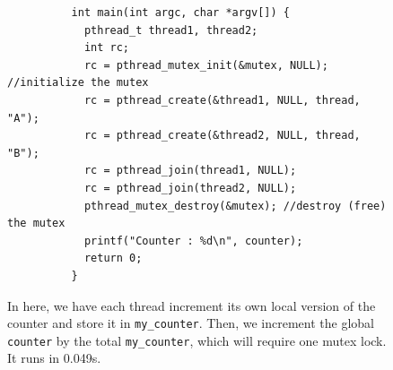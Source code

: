 \documentclass{article}
\begin{document}
\begin{enumerate}
\begin{figure}[H]
\begin{lstlisting}
          int main(int argc, char *argv[]) {
            pthread_t thread1, thread2; 
            int rc; 
            rc = pthread_mutex_init(&mutex, NULL); //initialize the mutex
            rc = pthread_create(&thread1, NULL, thread, "A"); 
            rc = pthread_create(&thread2, NULL, thread, "B"); 
            rc = pthread_join(thread1, NULL); 
            rc = pthread_join(thread2, NULL); 
            pthread_mutex_destroy(&mutex); //destroy (free) the mutex
            printf("Counter : %d\n", counter); 
            return 0; 
          }
        \end{lstlisting}
        \caption{In here, we have each thread increment its own local version of the counter and store it in \texttt{my\_counter}. Then, we increment the global \texttt{counter} by the total \texttt{my\_counter}, which will require one mutex lock. It runs in 0.049s. }  
        \label{fig:third_try}
      \end{figure}
    \end{enumerate}
\end{document}
